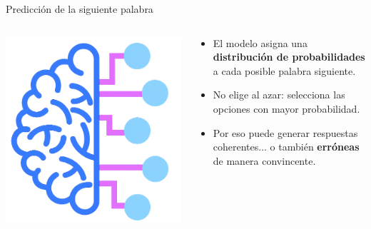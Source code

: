 \begin{frame}[t]{Predicción de la siguiente palabra}
\begin{columns}
\includegraphics[width=0.9\linewidth]{Figuras/Fig05.png} 
\begin{block}{}
\begin{itemize}
    \item El modelo asigna una \textbf{distribución de probabilidades} a cada posible palabra siguiente.
    \item No elige al azar: selecciona las opciones con mayor probabilidad.
    \item Por eso puede generar respuestas coherentes... o también \textbf{erróneas} de manera convincente.
\end{itemize}
\end{block}
\end{columns}
\end{frame}


